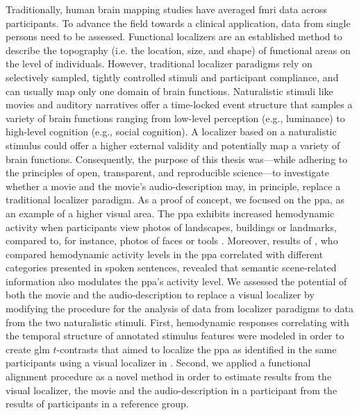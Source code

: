%
Traditionally, human brain mapping studies have averaged \ac{fmri} data across
participants.
%
To advance the field towards a clinical application, data from single persons
need to be assessed.
Functional localizers are an established method to describe the topography (i.e.
the location, size, and shape) of functional areas on the level of individuals.
However, traditional localizer paradigms rely on selectively sampled, tightly
controlled stimuli and participant compliance, and can usually map only one
domain of brain functions.
Naturalistic stimuli like movies and auditory narratives offer a time-locked
event structure that samples a variety of brain functions ranging from low-level
perception (e.g., luminance) to high-level cognition (e.g., social cognition).
%
A localizer based on a naturalistic stimulus could offer a higher external
validity and potentially map a variety of brain functions.
Consequently, the purpose of this thesis was---while adhering to the principles
of open, transparent, and reproducible science---to investigate whether a movie
and the movie's audio-description may, in principle, replace a traditional
localizer paradigm.
As a proof of concept, we focused on the \ac{ppa}, as an example of a higher
visual area.
%
The \ac{ppa} exhibits increased hemodynamic activity when participants view
photos of landscapes, buildings or landmarks, compared to, for instance, photos
of faces or tools \citep[cf,][for reviews]{epstein2014neural, aminoff2013role}.
%
Moreover, results of \citet{aziz2008modulation}, who compared hemodynamic
activity levels in the \ac{ppa} correlated with different categories presented
in spoken sentences, revealed that semantic scene-related information also
modulates the \ac{ppa}'s activity level.
%
We assessed the potential of both the movie and the audio-description to replace
a visual localizer by modifying the procedure for the analysis of data from
localizer paradigms to data from the two naturalistic stimuli.
%
First, hemodynamic responses correlating with the temporal structure of
annotated stimulus features \citep[cf.][]{haeusler2016cutanno,
haeusler2021speechanno} were modeled in order to create \ac{glm} $t$-contrasts
that aimed to localize the \ac{ppa} as identified in the same participants using
a visual localizer in \citet{sengupta2016extension}.
Second, we applied a functional alignment procedure as a novel method in order
to estimate results from the visual localizer, the movie and the
audio-description in a participant from the results of participants in a
reference group.

